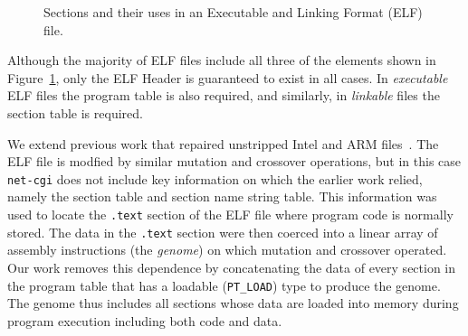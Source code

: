 \documentclass{sig-alternate}
\begin{document}
\begin{figure}[htb]
  \centering
\caption{\label{elf}Sections and their uses in an Executable and
  Linking Format (ELF) file.}
\end{figure}

\noindent Although the majority of ELF files include all three of the
elements shown in Figure~\ref{elf}, only the ELF Header is guaranteed
to exist in all cases.  In {\em executable} ELF files the program
table is also required, and similarly, in {\em linkable} files the
section table is required.

We extend previous work that repaired unstripped Intel and ARM
files~\cite{schulte2013embedded}.  The ELF file is modfied by similar
mutation and crossover operations, but in this case \texttt{net-cgi}
does not include key information on which the earlier work relied,
namely the section table and section name string table.  This
information was used to locate the \texttt{.text} section of the ELF
file where program code is normally stored.  The data in the
\texttt{.text} section were then coerced into a linear array of
assembly instructions (the \emph{genome}) on which mutation and
crossover operated.  Our work removes this dependence by
concatenating the data of every section in the program table that has
a loadable ({\tt PT\_LOAD}) type to produce the genome.  The genome
thus includes all
sections whose data are loaded into memory during program execution
including both code and data.
\end{document}
